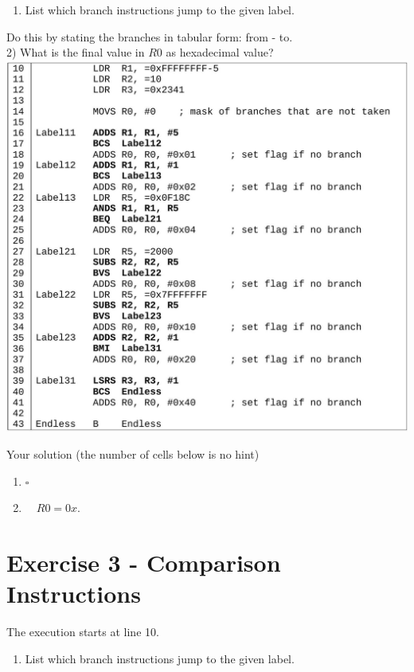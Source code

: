 \documentclass[10pt]{article}
\begin{document}
\begin{enumerate}
  \item List which branch instructions jump to the given label.
\end{enumerate}

Do this by stating the branches in tabular form: from - to.\\
2) What is the final value in $R 0$ as hexadecimal value?\\
\includegraphics[width=\linewidth]{images/2025_01_02_9902c2d2685de638ef73g-3}

Your solution (the number of cells below is no hint)

\begin{enumerate}
  \item $\square$
  \item $\quad R 0=0 x$. $\qquad$
\end{enumerate}

\section*{Exercise 3 - Comparison Instructions}
The execution starts at line 10.

\begin{enumerate}
  \item List which branch instructions jump to the given label.
\end{enumerate}
\end{document}

